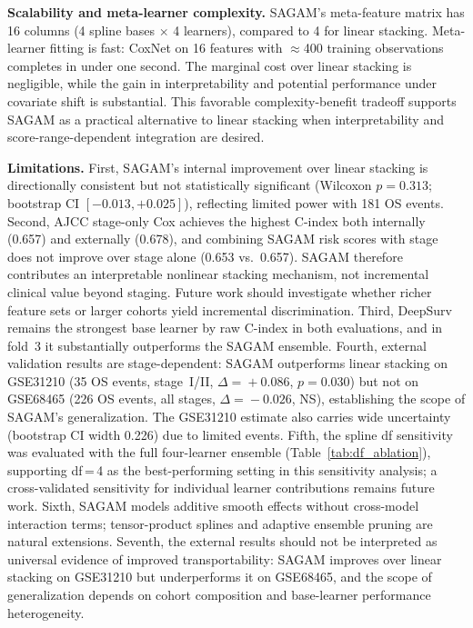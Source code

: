 \documentclass[conference]{IEEEtran}
\begin{document}
\textbf{Scalability and meta-learner complexity.}
SAGAM's meta-feature matrix has 16 columns (4 spline bases $\times$ 4
learners), compared to 4 for linear stacking.
Meta-learner fitting is fast: CoxNet on 16 features with $\approx$400
training observations completes in under one second.
The marginal cost over linear stacking is negligible, while the gain in
interpretability and potential performance under covariate shift is
substantial.
This favorable complexity-benefit tradeoff supports SAGAM as a practical
alternative to linear stacking when interpretability and score-range-dependent
integration are desired.

\textbf{Limitations.}
First, SAGAM's internal improvement over linear stacking is directionally
consistent but not statistically significant (Wilcoxon $p\!=\!0.313$;
bootstrap CI $[-0.013, +0.025]$), reflecting limited power with 181 OS
events.
Second, AJCC stage-only Cox achieves the highest C-index both internally
(0.657) and externally (0.678), and combining SAGAM risk scores with stage
does not improve over stage alone (0.653 vs.\ 0.657).
SAGAM therefore contributes an interpretable nonlinear stacking mechanism,
not incremental clinical value beyond staging.
Future work should investigate whether richer feature sets or larger cohorts
yield incremental discrimination.
Third, DeepSurv remains the strongest base learner by raw C-index in both
evaluations, and in fold~3 it substantially outperforms the SAGAM ensemble.
Fourth, external validation results are stage-dependent: SAGAM outperforms
linear stacking on GSE31210 (35 OS events, stage~I/II, $\Delta\!=\!+0.086$,
$p\!=\!0.030$) but not on GSE68465 (226 OS events, all stages,
$\Delta\!=\!-0.026$, NS), establishing the scope of SAGAM's generalization.
The GSE31210 estimate also carries wide uncertainty (bootstrap CI width 0.226)
due to limited events.
Fifth, the spline df sensitivity was evaluated with the full four-learner
ensemble (Table~\ref{tab:df_ablation}), supporting df\,=\,4 as the
best-performing setting in this sensitivity analysis;
a cross-validated sensitivity for individual learner contributions
remains future work.
Sixth, SAGAM models additive smooth effects without cross-model interaction
terms; tensor-product splines and adaptive ensemble pruning are natural
extensions.
Seventh, the external results should not be interpreted as universal evidence
of improved transportability: SAGAM improves over linear stacking on
GSE31210 but underperforms it on GSE68465, and the scope of generalization
depends on cohort composition and base-learner performance heterogeneity.
\end{document}
